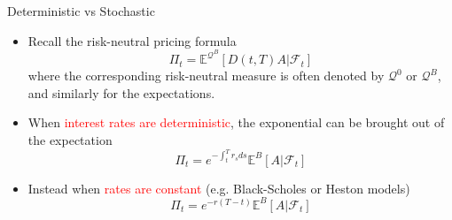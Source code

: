 \documentclass{beamer}
\begin{document}
\begin{frame}{Deterministic vs Stochastic}
	\begin{itemize}
		\item<0-> Recall the risk-neutral pricing formula \begin{equation*}
			\Pi_t = \mathbb{E}^{\mathcal{Q}^B}[D(t,T)A|\mathcal{F}_t]
		\end{equation*}
		where the corresponding risk-neutral measure is often denoted by $\mathcal{Q}^0$ or $\mathcal{Q}^B$, and similarly for the expectations. 
		\item<1-> When \textcolor{red}{interest rates are deterministic}, the exponential can be brought out of the expectation
		\begin{equation*}
			\Pi_t = e^{-\int_t^T r_s ds} \mathbb{E}^B\left[A|\mathcal{F}_t\right]
		\end{equation*}
		\item<2-> Instead when \textcolor{red}{rates are constant} (e.g. Black-Scholes or Heston models)
		\begin{equation*}
			\Pi_t = e^{-r(T-t)}\mathbb{E}^B\left[A|\mathcal{F}_t\right]
		\end{equation*}
	\end{itemize}
\end{frame}
\end{document}
